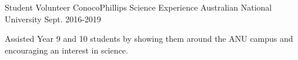\begin{cventries}
  \cventry
    {Student Volunteer} %
    {ConocoPhillips Science Experience} %
    {Australian National University} %
    {Sept. 2016-2019} %
    {
      \begin{cvitems} %
        \item {Assisted Year 9 and 10 students by showing them around the ANU campus and encouraging an interest in science.}
      \end{cvitems}
    }


\end{cventries}

